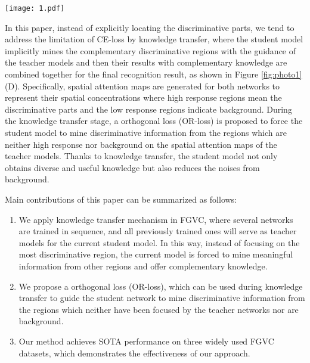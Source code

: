 \documentclass{article}
\begin{document}
\begin{figure*}[!t]
\centering
\texttt{[image: 1.pdf]}
\caption{Illustration of features learned by general methods (A B, and C) and our proposed method (D). (A) Convolution neural networks trained with cross entropy (CE) loss tend to find the most discriminative parts; (B) Part-based methods first locate several discriminative local parts and then extract features from them for classification; (C) Adversarial erasing methods encourage the model to learn more discriminative parts by progressively erasing the learned parts; (D) With assistant of Orthogonal loss, the student model implicitly mines the complementary and meaningful regions with the guidance of the teacher model.}
\label{fig:photo1}
\end{figure*}

In this paper, instead of explicitly locating the discriminative parts, we tend to address the limitation of CE-loss by knowledge transfer, where the student model implicitly mines the complementary discriminative regions with the guidance of the teacher models and then their results with complementary knowledge are combined together for the final recognition result, as shown in Figure \ref{fig:photo1}(D). Specifically, spatial attention maps are generated for both networks to represent their spatial concentrations where high response regions mean the discriminative parts and the low response regions indicate background. During the knowledge transfer stage, a orthogonal loss (OR-loss) is proposed to force the student model to mine discriminative information from the regions which are neither high response nor background on the spatial attention maps of the teacher models. Thanks to knowledge transfer, the student model not only obtains diverse and useful knowledge but also reduces the noises from background.

Main contributions of this paper can be summarized as follows:

\begin{enumerate}
    \item We apply knowledge transfer mechanism in FGVC, where several networks are trained in sequence, and all previously trained ones will serve as teacher models for the current student model. In this way, instead of focusing on the most discriminative region, the current model is forced to mine meaningful information from other regions and offer complementary knowledge.

    \item We propose a orthogonal loss (OR-loss), which can be used during knowledge transfer to guide the student network to mine discriminative information from the regions which neither have been focused by the teacher networks nor are background.
    
    \item Our method achieves SOTA performance on three widely used FGVC datasets, which demonstrates the effectiveness of our approach.
\end{enumerate}
\end{document}
